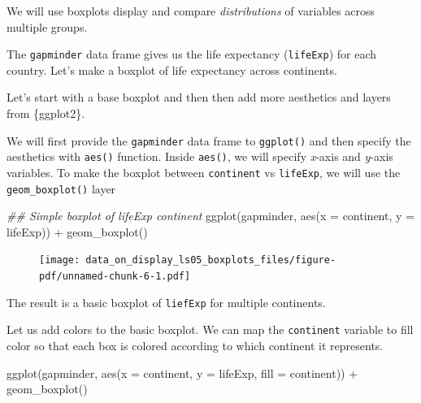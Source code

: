 \documentclass[
  letterpaper,
  DIV=11,
  numbers=noendperiod]{scrreprt}
\newenvironment{Shaded}{\begin{snugshade}}{\end{snugshade}}
\newcommand{\AttributeTok}[1]{\textcolor[rgb]{0.40,0.45,0.13}{#1}}
\newcommand{\DocumentationTok}[1]{\textcolor[rgb]{0.37,0.37,0.37}{\textit{#1}}}
\newcommand{\FunctionTok}[1]{\textcolor[rgb]{0.28,0.35,0.67}{#1}}
\newcommand{\NormalTok}[1]{\textcolor[rgb]{0.00,0.23,0.31}{#1}}
\newcommand{\SpecialCharTok}[1]{\textcolor[rgb]{0.37,0.37,0.37}{#1}}
\begin{document}
We will use boxplots display and compare \emph{distributions} of
variables across multiple groups.

The \texttt{gapminder} data frame gives us the life expectancy
(\texttt{lifeExp}) for each country. Let's make a boxplot of life
expectancy across continents.

Let's start with a base boxplot and then then add more aesthetics and
layers from \{ggplot2\}.

We will first provide the \texttt{gapminder} data frame to
\texttt{ggplot()} and then specify the aesthetics with \texttt{aes()}
function. Inside \texttt{aes()}, we will specify \emph{x}-axis and
\emph{y}-axis variables. To make the boxplot between \texttt{continent}
vs \texttt{lifeExp}, we will use the \texttt{geom\_boxplot()} layer

\begin{Shaded}
\begin{Highlighting}[]
\DocumentationTok{\#\# Simple boxplot of lifeExp continent}
\FunctionTok{ggplot}\NormalTok{(gapminder, }
       \FunctionTok{aes}\NormalTok{(}\AttributeTok{x =}\NormalTok{ continent, }
           \AttributeTok{y =}\NormalTok{ lifeExp)) }\SpecialCharTok{+}
  \FunctionTok{geom\_boxplot}\NormalTok{()}
\end{Highlighting}
\end{Shaded}

\begin{figure}[H]

{\centering \texttt{[image: data\_on\_display\_ls05\_boxplots\_files/figure-pdf/unnamed-chunk-6-1.pdf]}

}

\end{figure}

The result is a basic boxplot of \texttt{liefExp} for multiple
continents.

Let us add colors to the basic boxplot. We can map the
\texttt{continent} variable to fill color so that each box is colored
according to which continent it represents.

\begin{Shaded}
\begin{Highlighting}[]
\FunctionTok{ggplot}\NormalTok{(gapminder, }
       \FunctionTok{aes}\NormalTok{(}\AttributeTok{x =}\NormalTok{ continent,}
           \AttributeTok{y =}\NormalTok{ lifeExp, }
           \AttributeTok{fill =}\NormalTok{ continent)) }\SpecialCharTok{+}
  \FunctionTok{geom\_boxplot}\NormalTok{()}
\end{Highlighting}
\end{Shaded}
\end{document}
